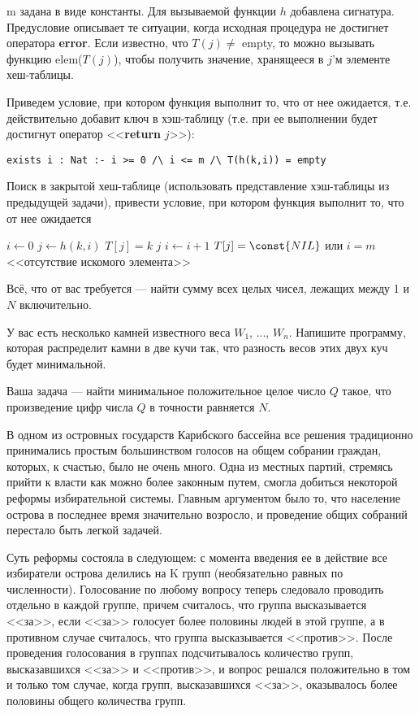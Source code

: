 m задана в виде константы. Для вызываемой функции $h$ добавлена сигнатура. Предусловие описывает те ситуации, когда исходная процедура не достигнет оператора \textbf{error}. Если известно, что $T(j) \neq$ empty, то можно вызывать функцию elem($T(j)$), чтобы получить значение, хранящееся в $j$'м элементе хеш-таблицы.

Приведем условие, при котором функция выполнит то, что от нее ожидается, т.е. действительно добавит ключ в хэш-таблицу (т.е. при ее выполнении будет достигнут оператор <<\textbf{return} $j$>>):

\begin{lstlisting}
exists i : Nat :- i >= 0 /\ i <= m /\ T(h(k,i)) = empty
\end{lstlisting}


\z Поиск в закрытой хеш-таблице (использовать представление хэш-таблицы из предыдущей задачи), привести условие, при котором функция выполнит то, что от нее ожидается

\begin{codebox}
\li $i \gets 0$
\li \Repeat $j \gets h(k,i)$
\li \If $T[j] = k$
\li \Then \Return $j$ \End
\li $i \gets i+1$
\li \Until $T[j] = \const{NIL}$ или $i = m$ \End
\li \Error <<отсутствие искомого элемента>>
\end{codebox}



\z Всё, что от вас требуется — найти сумму всех целых чисел, лежащих между 1 и $N$ включительно.

\z У вас есть несколько камней известного веса $W_1$, ..., $W_n$. Напишите программу, которая распределит камни в две кучи так, что разность весов этих двух куч будет минимальной.

\z Ваша задача — найти минимальное положительное целое число $Q$ такое, что произведение цифр числа $Q$ в точности равняется $N$.

\z В одном из островных государств Карибского бассейна все решения традиционно принимались простым большинством голосов на общем собрании граждан, которых, к счастью, было не очень много. Одна из местных партий, стремясь прийти к власти как можно более законным путем, смогла добиться некоторой реформы избирательной системы. Главным аргументом было то, что население острова в последнее время значительно возросло, и проведение общих собраний перестало быть легкой задачей.

Суть реформы состояла в следующем: с момента введения ее в действие все избиратели острова делились на K групп (необязательно равных по численности). Голосование по любому вопросу теперь следовало проводить отдельно в каждой группе, причем считалось, что группа высказывается <<за>>, если <<за>> голосует более половины людей в этой группе, а в противном случае считалось, что группа высказывается <<против>>. После проведения голосования в группах подсчитывалось количество групп, высказавшихся <<за>> и <<против>>, и вопрос решался положительно в том и только том случае, когда групп, высказавшихся <<за>>, оказывалось более половины общего количества групп.

